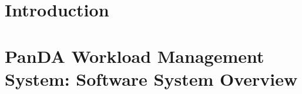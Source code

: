 \documentclass[smallextended]{svjour3}      %
\begin{document}


\section{Introduction}
\label{sec:introduction}



\section{PanDA Workload Management System: Software System Overview}
\label{sec:overview}

\end{document}
